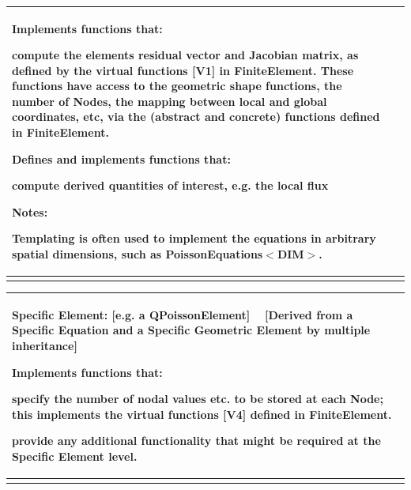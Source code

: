 \begin{center}
\begin{longtabu}
\begin{tabularx}{\linewidth}{|*{2}{>{\raggedright\arraybackslash}X|}}
\begin{DoxyItemize}
\item Implements functions that\+:
\begin{DoxyItemize}
\item compute the element\textquotesingle{}s residual vector and Jacobian matrix, as defined by the virtual functions \mbox{[}V1\mbox{]} in {\ttfamily Finite\+Element}. These functions have access to the geometric shape functions, the number of {\ttfamily Nodes}, the mapping between local and global coordinates, etc, via the (abstract and concrete) functions defined in {\ttfamily Finite\+Element}.
\end{DoxyItemize}
\end{DoxyItemize}
\begin{DoxyItemize}
\item Defines and implements functions that\+:
\begin{DoxyItemize}
\item compute derived quantities of interest, e.\+g. the local flux
\end{DoxyItemize}
\end{DoxyItemize}{\bfseries Notes\+:}
\begin{DoxyItemize}
\item Templating is often used to implement the equations in arbitrary spatial dimensions, such as {\ttfamily Poisson\+Equations$<$\+D\+I\+M$>$}.   
\end{DoxyItemize}\\\cline{1-2}
\end{tabularx}
\begin{center} \begin{tabularx}{\linewidth}{|*{1}{>{\raggedright\arraybackslash}X|}}\hline
\begin{center} {\bfseries Specific Element\+:} \mbox{[}e.\+g. a {\ttfamily Q\+Poisson\+Element}\mbox{]} ~\newline
 \mbox{[}Derived from a {\bfseries Specific Equation } and a {\bfseries Specific Geometric Element} by multiple inheritance\mbox{]} \end{center}  


\begin{DoxyItemize}
\item Implements functions that\+:
\begin{DoxyItemize}
\item specify the number of nodal values etc. to be stored at each {\ttfamily Node}; this implements the virtual functions \mbox{[}V4\mbox{]} defined in {\ttfamily Finite\+Element}.
\item provide any additional functionality that might be required at the {\bfseries Specific} {\bfseries Element} level. 
\end{DoxyItemize}
\end{DoxyItemize}\\\cline{1-1}
\end{tabularx}
\end{center} \\
\end{longtabu}
\end{center}  

